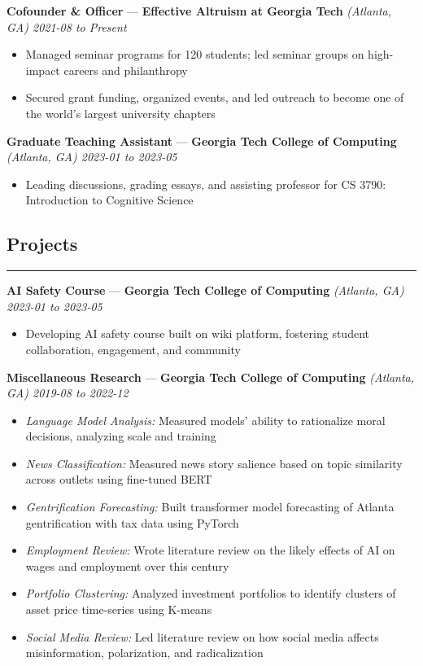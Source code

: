 \documentclass[10pt]{article}
\newcommand{\resumeHeading}[1]{
    \subsection*{#1}
    \hrule
    \vspace*{5pt}
}
\newcommand{\resumeSubHeading}[5]{
    \vspace*{5pt}
    \textbf{#1} — \textbf{#2} \textsl{(#3) \hfill #4 to #5}
}
\begin{document}
\resumeSubHeading
    {Cofounder \& Officer}
    {Effective Altruism at Georgia Tech}
    {Atlanta, GA}
    {2021-08}
    {Present}
\begin{itemize}
    \item Managed seminar programs for 120 students; led seminar groups on high-impact careers and philanthropy
    \item Secured grant funding, organized events, and led outreach to become one of the world's largest university chapters
\end{itemize}

\resumeSubHeading
    {Graduate Teaching Assistant}
    {Georgia Tech College of Computing}
    {Atlanta, GA}
    {2023-01}
    {2023-05}
\begin{itemize}
    \item Leading discussions, grading essays, and assisting professor for CS 3790: Introduction to Cognitive Science
\end{itemize}



\resumeHeading{Projects \vspace{-2.5pt}}

\resumeSubHeading
    {AI Safety Course}
    {Georgia Tech College of Computing}
    {Atlanta, GA}
    {2023-01}
    {2023-05}
\begin{itemize}
    \item Developing AI safety course built on wiki platform, fostering student collaboration, engagement, and community
\end{itemize}

\resumeSubHeading
    {Miscellaneous Research}
    {Georgia Tech College of Computing}
    {Atlanta, GA}
    {2019-08}
    {2022-12}
\begin{itemize}
    \item \emph{Language Model Analysis:}
        Measured models' ability to rationalize moral decisions, analyzing scale and training
    \item \emph{News Classification:}
        Measured news story salience based on topic similarity across outlets using fine-tuned BERT
    \item \emph{Gentrification Forecasting:}
        Built transformer model forecasting of Atlanta gentrification with tax data using PyTorch
    \item \emph{Employment Review:}
        Wrote literature review on the likely effects of AI on wages and employment over this century
    \item \emph{Portfolio Clustering:}
        Analyzed investment portfolios to identify clusters of asset price time-series using K-means
    \item \emph{Social Media Review:}
        Led literature review on how social media affects misinformation, polarization, and radicalization
\end{itemize}
\end{document}
